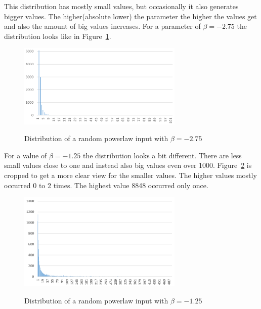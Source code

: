 This distribution has mostly small values, but occasionally it also generates bigger values.
The higher(absolute lower) the parameter the higher the values get and also the amount of big values increases.
For a parameter of $\beta=-2.75$ the distribution looks like in Figure~\ref{fig:powerDistExample1}.

\begin{figure}[h]
      \caption{Distribution of a random powerlaw input with $\beta=-2.75$}
      \centering
      \includegraphics[width=0.7\textwidth]{figures/images/numberGenerator/powerlaw_-2_75.png}\label{fig:powerDistExample1}
\end{figure}

For a value of $\beta=-1.25$ the distribution looks a bit different.
There are less small values close to one and instead also big values even over 1000.
Figure~\ref{fig:powerDistExample2} is cropped to get a more clear view for the smaller values.
The higher values mostly occurred 0 to 2 times.
The highest value 8848 occurred only once.

\begin{figure}[h]
      \caption{Distribution of a random powerlaw input with $\beta=-1.25$}
      \centering
      \includegraphics[width=0.7\textwidth]{figures/images/numberGenerator/powerlaw_-1_25.png}\label{fig:powerDistExample2}
\end{figure}
